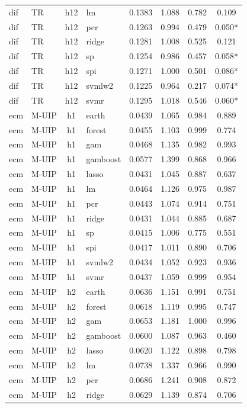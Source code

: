 \begin{ThreePartTable}
\begin{longtable}[t]{llclcccc}
dif & TR & h12 & lm & 0.1383 & 1.088 & 0.782 & 0.109\\
dif & TR & h12 & pcr & 0.1263 & 0.994 & 0.479 & 0.050*\\
dif & TR & h12 & ridge & 0.1281 & 1.008 & 0.525 & 0.121\\
dif & TR & h12 & sp & 0.1254 & 0.986 & 0.457 & 0.058*\\
dif & TR & h12 & spi & 0.1271 & 1.000 & 0.501 & 0.086*\\
dif & TR & h12 & svmlw2 & 0.1225 & 0.964 & 0.217 & 0.074*\\
dif & TR & h12 & svmr & 0.1295 & 1.018 & 0.546 & 0.060*\\
\addlinespace
ecm & M-UIP & h1 & earth & 0.0439 & 1.065 & 0.984 & 0.889\\
ecm & M-UIP & h1 & forest & 0.0455 & 1.103 & 0.999 & 0.774\\
ecm & M-UIP & h1 & gam & 0.0468 & 1.135 & 0.982 & 0.993\\
ecm & M-UIP & h1 & gamboost & 0.0577 & 1.399 & 0.868 & 0.966\\
ecm & M-UIP & h1 & lasso & 0.0431 & 1.045 & 0.887 & 0.637\\
ecm & M-UIP & h1 & lm & 0.0464 & 1.126 & 0.975 & 0.987\\
ecm & M-UIP & h1 & pcr & 0.0443 & 1.074 & 0.914 & 0.751\\
ecm & M-UIP & h1 & ridge & 0.0431 & 1.044 & 0.885 & 0.687\\
ecm & M-UIP & h1 & sp & 0.0415 & 1.006 & 0.775 & 0.551\\
ecm & M-UIP & h1 & spi & 0.0417 & 1.011 & 0.890 & 0.706\\
ecm & M-UIP & h1 & svmlw2 & 0.0434 & 1.052 & 0.923 & 0.936\\
ecm & M-UIP & h1 & svmr & 0.0437 & 1.059 & 0.999 & 0.954\\
\addlinespace
ecm & M-UIP & h2 & earth & 0.0636 & 1.151 & 0.991 & 0.751\\
ecm & M-UIP & h2 & forest & 0.0618 & 1.119 & 0.995 & 0.747\\
ecm & M-UIP & h2 & gam & 0.0653 & 1.181 & 1.000 & 0.996\\
ecm & M-UIP & h2 & gamboost & 0.0600 & 1.087 & 0.963 & 0.460\\
ecm & M-UIP & h2 & lasso & 0.0620 & 1.122 & 0.898 & 0.798\\
ecm & M-UIP & h2 & lm & 0.0738 & 1.337 & 0.966 & 0.990\\
ecm & M-UIP & h2 & pcr & 0.0686 & 1.241 & 0.908 & 0.872\\
ecm & M-UIP & h2 & ridge & 0.0629 & 1.139 & 0.874 & 0.706\\

\end{longtable}
\end{ThreePartTable}
